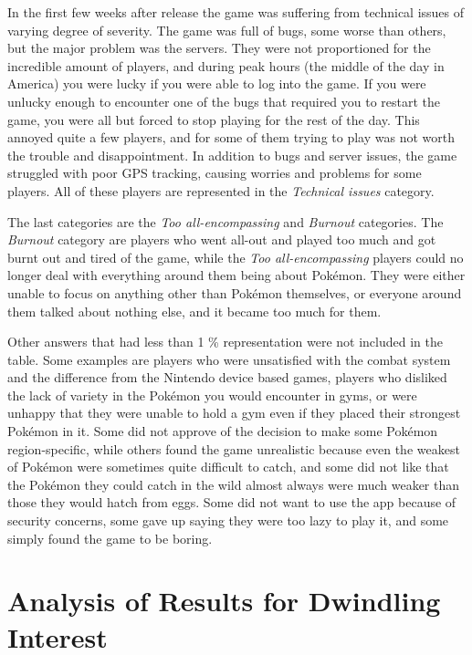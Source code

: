 In the first few weeks after release the game was suffering from technical issues of varying degree of severity. The game was full of bugs, some worse than others, but the major problem was the servers. They were not proportioned for the incredible amount of players, and during peak hours (the middle of the day in America) you were lucky if you were able to log into the game. If you were unlucky enough to encounter one of the bugs that required you to restart the game, you were all but forced to stop playing for the rest of the day. This annoyed quite a few players, and for some of them trying to play was not worth the trouble and disappointment. In addition to bugs and server issues, the game struggled with poor GPS tracking, causing worries and problems for some players. All of these players are represented in the \emph{Technical issues} category.

The last categories are the \emph{Too all-encompassing} and \emph{Burnout} categories. The \emph{Burnout} category are players who went all-out and played too much and got burnt out and tired of the game, while the \emph{Too all-encompassing} players could no longer deal with everything around them being about Pokémon. They were either unable to focus on anything other than Pokémon themselves, or everyone around them talked about nothing else, and it became too much for them.

Other answers that had less than 1 \% representation were not included in the table. Some examples are players who were unsatisfied with the combat system and the difference from the Nintendo device based games, players who disliked the lack of variety in the Pokémon you would encounter in gyms, or were unhappy that they were unable to hold a gym even if they placed their strongest Pokémon in it. Some did not approve of the decision to make some Pokémon region-specific, while others found the game unrealistic because even the weakest of Pokémon were sometimes quite difficult to catch, and some did not like that the Pokémon they could catch in the wild almost always were much weaker than those they would hatch from eggs. Some did not want to use the app because of security concerns, some gave up saying they were too lazy to play it, and some simply found the game to be boring.

\section{Analysis of Results for Dwindling Interest}
\label{sec:success-factors-quitting-analysis}


